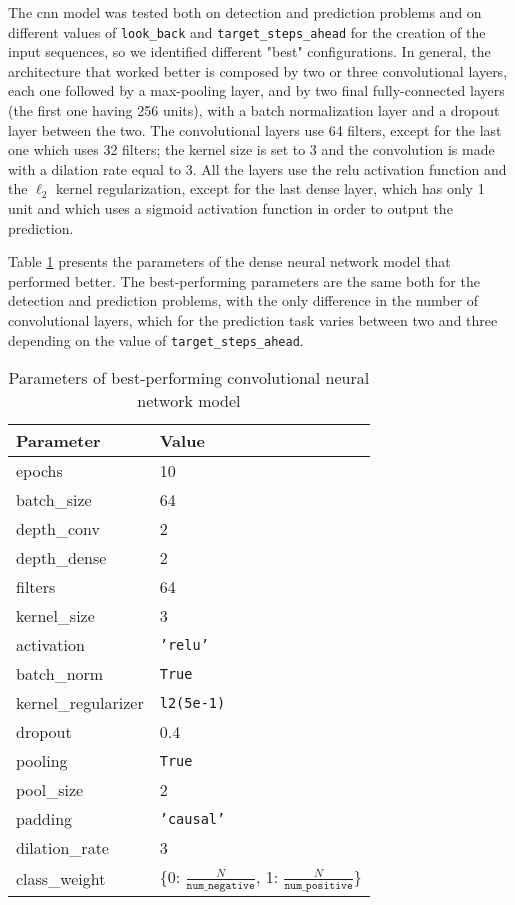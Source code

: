 The \acs{cnn} model was tested both on detection and prediction problems and on different values of \texttt{look\_back} and \texttt{target\_steps\_ahead} for the creation of the input sequences, so we identified different "best" configurations. In general, the architecture that worked better is composed by two or three convolutional layers, each one followed by a max-pooling layer, and by two final fully-connected layers (the first one having 256 units), with a batch normalization layer and a dropout layer between the two. The convolutional layers use 64 filters, except for the last one which uses 32 filters; the kernel size is set to 3 and the convolution is made with a dilation rate equal to 3. All the layers use the \acs{relu} activation function and the $\ell_2$ kernel regularization, except for the last dense layer, which has only 1 unit and which uses a sigmoid activation function in order to output the prediction. 

Table \ref{tab:conv_param} presents the parameters of the dense neural network model that performed better. The best-performing parameters are the same both for the detection and prediction problems, with the only difference in the number of convolutional layers, which for the prediction task varies between two and three depending on the value of \texttt{target\_steps\_ahead}.
\begin{table}[htbp]
    \centering
    \begin{tabular}{ll}
        \hline
        \textbf{Parameter}  & \textbf{Value} \\\hline
        epochs              & 10 \\
        batch\_size         & 64 \\
        depth\_conv         & 2 \\
        depth\_dense        & 2 \\
        filters             & 64 \\
        kernel\_size        & 3 \\
        activation          & \texttt{'relu'} \\
        batch\_norm         & \texttt{True} \\
        kernel\_regularizer & \texttt{l2(5e-1)} \\
        dropout             & 0.4 \\
        pooling             & \texttt{True} \\
        pool\_size          & 2 \\
        padding             & \texttt{'causal'} \\
        dilation\_rate      & 3 \\
        class\_weight       & \{0: $\frac{N}{\texttt{num\_negative}}$, 1: $\frac{N}{\texttt{num\_positive}}$\} \\\hline
    \end{tabular}
    \caption{Parameters of best-performing convolutional neural network model}
    \label{tab:conv_param}
\end{table}

